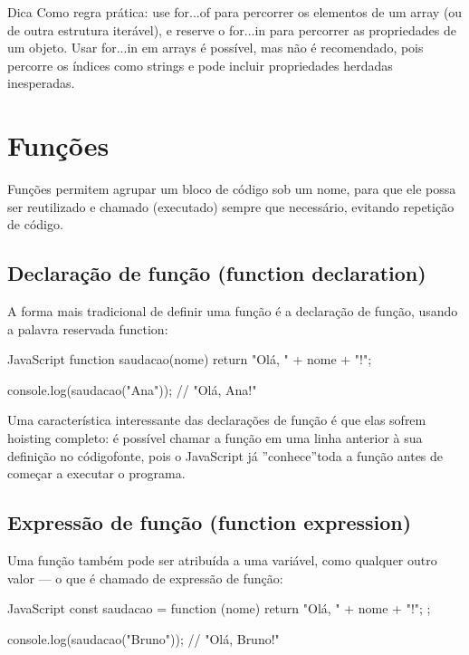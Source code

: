 \begin{infobox}{Dica}
Como regra prática: use for...of para percorrer os elementos de um array (ou de outra estrutura iterável), e reserve o for...in para percorrer as propriedades de um objeto. Usar for...in em arrays é possível, mas não é recomendado, pois percorre os índices como strings e pode incluir propriedades herdadas inesperadas.
\end{infobox}

\section{Funções}

Funções permitem agrupar um bloco de código sob um nome, para que ele possa ser reutilizado e chamado (executado) sempre que necessário, evitando repetição de código.

\subsection{Declaração de função (function declaration)}

A forma mais tradicional de definir uma função é a declaração de função, usando a palavra reservada function:

\begin{codebox}{JavaScript}
function saudacao(nome) {
  return "Olá, " + nome + "!";
}

console.log(saudacao("Ana")); // "Olá, Ana!"
\end{codebox}

Uma característica interessante das declarações de função é que elas sofrem hoisting completo: é possível chamar a função em uma linha anterior à sua definição no códigofonte, pois o JavaScript já ”conhece”toda a função antes de começar a executar o programa.

\subsection{Expressão de função (function expression)}

Uma função também pode ser atribuída a uma variável, como qualquer outro valor — o que é chamado de expressão de função:

\begin{codebox}{JavaScript}
const saudacao = function (nome) {
   return "Olá, " + nome + "!";
};

console.log(saudacao("Bruno")); // "Olá, Bruno!"
\end{codebox}

